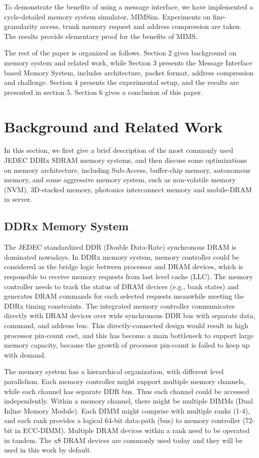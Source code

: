 \documentclass[pageno]{jpaper}
\begin{document}
To demonstrate the benefits of using a message interface, we have implemented a cycle-detailed memory system simulator, MIMSim. Experiments on fine-granularity access, trunk memory request and address compression are taken. The results provide elementary proof for the benefits of MIMS.

The rest of the paper is organized as follows. Section 2 gives background on memory system and related work, while Section 3 presents the Message Interface based Memory System, includes architecture, packet format, address compression and challenge. Section 4 presents the experimental setup, and the results are presented in section 5. Section 6 gives a conclusion of this paper.



\section{Background and Related Work}

In this section, we first give a brief description of the most commonly used JEDEC DDRx SDRAM memory systems, and then discuss some optimizations on memory architecture, including Sub-Access, buffer-chip memory, autonomous memory, and some aggressive memory system, such as non-volatile memory (NVM), 3D-stacked memory, photonics interconnect memory and mobile-DRAM in server.

\subsection {DDRx Memory System}

The JEDEC standardized DDR (Double Data-Rate) \cite{DDR3Specification} synchronous DRAM is dominated nowadays. In DDRx memory system, memory controller could be considered as the bridge logic between processor and DRAM devices, which is responsible to receive memory requests from last level cache (LLC). The memory controller needs to track the status of DRAM devices (e.g., bank states) and generates DRAM commands for each selected requests meanwhile meeting the DDRx timing constraints. The integrated memory controller communicates directly with DRAM devices over wide synchronous DDR bus with separate data, command, and address bus. This directly-connected design would result in high processor pin-count cost, and this has become a main bottleneck to support large memory capacity, because the growth of processor pin-count is failed to keep up with demand.

The memory system has a hierarchical organization, with different level parallelism. Each memory controller might support multiple memory channels, while each channel has separate DDR bus. Thus each channel could be accessed independently. Within a memory channel, there might be multiple DIMMs (Dual Inline Memory Module). Each DIMM might comprise with multiple ranks (1-4), and each rank provides a logical 64-bit data-path (bus) to memory controller (72-bit in ECC-DIMM). Multiple DRAM devices within a rank need to be operated in tandem. The x8 DRAM devices are commonly used today and they will be used in this work by default.
\end{document}
